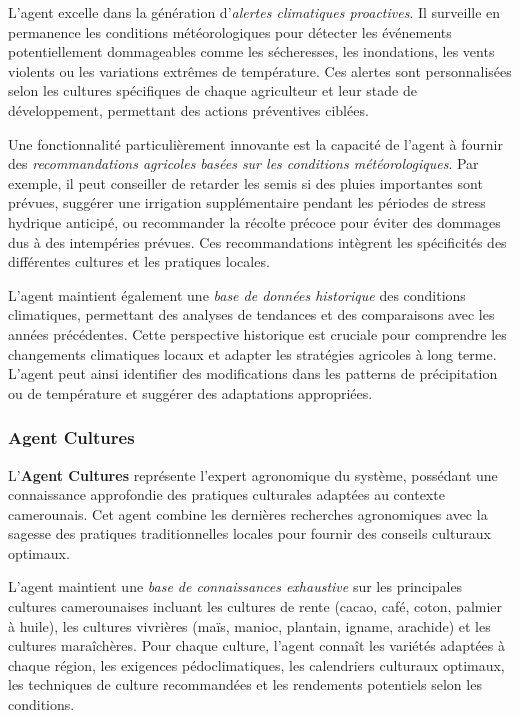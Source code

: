 L'agent excelle dans la génération d'\emph{alertes climatiques proactives}. Il surveille en permanence les conditions météorologiques pour détecter les événements potentiellement dommageables comme les sécheresses, les inondations, les vents violents ou les variations extrêmes de température. Ces alertes sont personnalisées selon les cultures spécifiques de chaque agriculteur et leur stade de développement, permettant des actions préventives ciblées.

Une fonctionnalité particulièrement innovante est la capacité de l'agent à fournir des \emph{recommandations agricoles basées sur les conditions météorologiques}. Par exemple, il peut conseiller de retarder les semis si des pluies importantes sont prévues, suggérer une irrigation supplémentaire pendant les périodes de stress hydrique anticipé, ou recommander la récolte précoce pour éviter des dommages dus à des intempéries prévues. Ces recommandations intègrent les spécificités des différentes cultures et les pratiques locales.

L'agent maintient également une \emph{base de données historique} des conditions climatiques, permettant des analyses de tendances et des comparaisons avec les années précédentes. Cette perspective historique est cruciale pour comprendre les changements climatiques locaux et adapter les stratégies agricoles à long terme. L'agent peut ainsi identifier des modifications dans les patterns de précipitation ou de température et suggérer des adaptations appropriées.

\subsubsection{Agent Cultures}

L'\textbf{Agent Cultures} représente l'expert agronomique du système, possédant une connaissance approfondie des pratiques culturales adaptées au contexte camerounais. Cet agent combine les dernières recherches agronomiques avec la sagesse des pratiques traditionnelles locales pour fournir des conseils culturaux optimaux.

L'agent maintient une \emph{base de connaissances exhaustive} sur les principales cultures camerounaises incluant les cultures de rente (cacao, café, coton, palmier à huile), les cultures vivrières (maïs, manioc, plantain, igname, arachide) et les cultures maraîchères. Pour chaque culture, l'agent connaît les variétés adaptées à chaque région, les exigences pédoclimatiques, les calendriers culturaux optimaux, les techniques de culture recommandées et les rendements potentiels selon les conditions.

